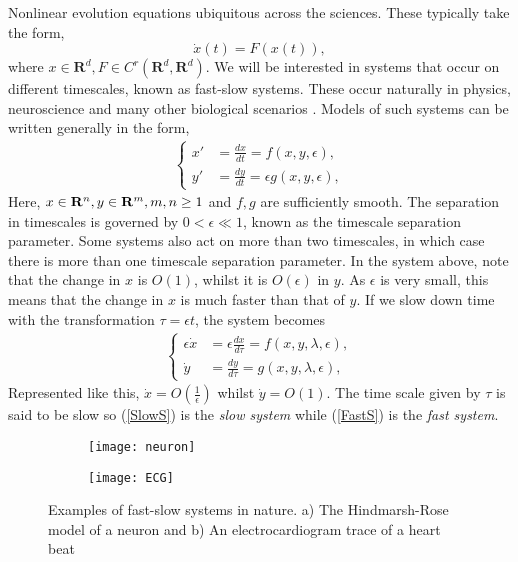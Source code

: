 Nonlinear evolution equations ubiquitous across the sciences. These typically take the form,
$$ \dot{x}(t) = F\left(x(t)\right),$$ where $x\in \mathbf{R}^d, F\in C^r(\mathbf{R}^d,\mathbf{R}^d)$. We will be interested in systems that occur on different timescales, known as fast-slow systems. These occur naturally in physics, neuroscience and many other biological scenarios \citep{Fitzhugh,Nagumo,Vanderpol}. Models of such systems can be written generally in the form,
\begin{align}
\begin{cases}
x' &=\frac{dx}{dt}= f(x,y,\epsilon),\\
y' &= \frac{dy}{dt}= \epsilon g(x,y,  \epsilon),
\end{cases}\label{FastS}
\end{align} 
Here, $x \in \mathbf{R}^n, y \in \mathbf{R}^m, m,n \geq 1$ and $f,g$ are sufficiently smooth. The separation in timescales is governed by $0<\epsilon \ll 1$, known as the timescale separation parameter. Some systems also act on more than two timescales, in which case there is more than one timescale separation parameter.  In the system above, note that the change in $x$ is $O(1)$, whilst it is $O(\epsilon)$ in $y$. As $\epsilon$ is very small, this means that the change in $x$ is much faster than that of $y$. If we slow down time with the transformation $\tau = \epsilon t$, the system becomes  
\begin{align}
	\begin{cases}
	\epsilon \dot{x} &= \epsilon \frac{dx}{d\tau} = f(x,y,\lambda, \epsilon),\\
	\dot{y} & = \frac{dy}{d \tau} =  g( x,y, \lambda, \epsilon),
	\end{cases}\label{SlowS}
\end{align} 
Represented like this, $\dot{x} = O(\frac{1}{\epsilon})$ whilst $\dot{y} = O(1)$.  The time scale given by $\tau$ is said to be slow so (\ref{SlowS}) is the \emph{slow system} while (\ref{FastS}) is the \emph{fast system}.\\


\begin{figure}[h]
	\begin{subfigure}[b]{0.5\linewidth}
		\texttt{[image: neuron]}
		\caption{}
		\label{neuron}
		
	\end{subfigure}
\hfill
	\begin{subfigure}[b]{0.5\linewidth}
		\texttt{[image: ECG]}
		\caption{}
		\label{ECG}
	\end{subfigure}
	\caption{Examples of fast-slow systems in nature. a) The Hindmarsh-Rose model of a neuron \citep{neuron} and b) An electrocardiogram trace of a heart beat \citep{ECG}}
	\label{fig:nature}
\end{figure} 



